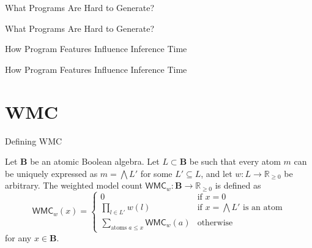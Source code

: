 \documentclass{beamer}
\begin{document}
\begin{frame}{What Programs Are Hard to Generate?}
  \begin{figure}
    \centering
    
  \end{figure}
\end{frame}

\begin{frame}{What Programs Are Hard to Generate?}
  \begin{figure}
    \centering
    \resizebox{\linewidth}{!}{}
  \end{figure}
\end{frame}

\begin{frame}{How Program Features Influence Inference Time}
  \begin{figure}
    \centering
    \resizebox{\linewidth}{!}{}
  \end{figure}
\end{frame}

\begin{frame}{How Program Features Influence Inference Time}
  \begin{figure}
    \centering
    
  \end{figure}
\end{frame}

\section{WMC}

\begin{frame}{Defining WMC}
  \begin{definition}
    Let $\mathbf{B}$ be an atomic Boolean algebra. Let $L \subset \mathbf{B}$ be
    such that every atom $m$ can be uniquely expressed as $m = \bigwedge L'$ for
    some $L' \subseteq L$, and let $w\colon L \to \mathbb{R}_{\ge 0}$ be
    arbitrary. The \alert{weighted model count} $\mathsf{WMC}_w\colon \mathbf{B}
    \to \mathbb{R}_{\ge 0}$ is defined as
    \[
      \mathsf{WMC}_w(x) = \begin{cases}
        0 & \text{if } x = 0 \\
        \prod_{l \in L'} w(l) & \text{if } x = \bigwedge L' \text{ is an atom}
        \\
        \sum_{\text{atoms } a \le x} \mathsf{WMC}_w(a) & \text{otherwise}
      \end{cases}
    \]
    for any $x \in \mathbf{B}$.
  \end{definition}
\end{frame}
\end{document}
